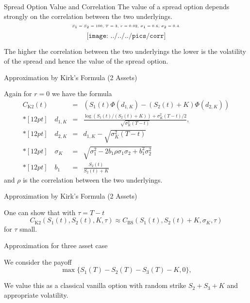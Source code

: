 {Spread Option Value and Correlation}
The value of a spread option depends strongly on the correlation between the two underlyings.
$$\tiny\text{$S_1=S_2=100$, $T=3$, $r=0.02$, $\sigma_1=0.6$, $\sigma_2=0.4$.}$$
\vspace{-0.76cm}
$$\texttt{[image: ../../../pics/corr]}$$




\vspace{-1cm}


	The higher the correlation between the two underlyings the lower is the volatility of the spread and hence the value of the spread option.





{Approximation by Kirk's Formula (2 Assets)}

Again for $r=0$ we have the formula $$\begin{array}{lll}
 C_{\mbox{K2}}(t) & = & (S_1(t)\Phi(d_{1,K})-(S_2(t)+K)\Phi(d_{2,K}))
 \\*[12pt]
 \quad d_{1,K} & = & \frac{\log(S_1(t)/(S_2(t)+K))+\sigma_K^{2}(T-t)/2}{\sqrt{\sigma_K^{2}(T-t)}},\\*[12pt]
  \quad d_{2,K} &=&d_{1,K}-\sqrt{\sigma_K^{2}(T-t)}
 \\*[12pt]
 \quad \sigma_K & = & \sqrt{\sigma_1^2-2b_1\rho\sigma_1\sigma_2+b_1^2\sigma_2^2}\\*[12pt]
 \quad b_1 &=& \frac{S_2(t)}{S_2(t)+K}
\end{array}$$
and $\rho$ is the correlation between the two underlyings.

{Approximation by Kirk's Formula (2 Assets)}

One can show that with $\tau=T-t$
$$
 C_{\mbox{K2}}(S_1(t), S_2(t), K, \tau) \approx
 C_{\mbox{BS}}(S_1(t), S_2(t)+K, \sigma_K, \tau)
 $$
  for  $\tau$ small.

{Approximation for three asset case}






	We consider the payoff
\begin{equation}
\max\{S_1(T) - S_2(T)- S_3(T)-K, 0\},
\label{Three_asset_value}
\end{equation}


	We value this as a classical vanilla option with random strike $S_2+S_3+K$ and appropriate volatility.





